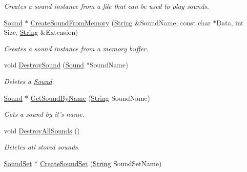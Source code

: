 \begin{DoxyCompactItemize}
\begin{DoxyCompactList}\small\item\em Creates a sound instance from a file that can be used to play sounds. \item\end{DoxyCompactList}\item 
\hyperlink{classphys_1_1Sound}{Sound} $\ast$ \hyperlink{classphys_1_1SoundManager_aa039c3d7a5ee961be0934a58fd3826fa}{CreateSoundFromMemory} (\hyperlink{namespacephys_aa03900411993de7fbfec4789bc1d392e}{String} \&SoundName, const char $\ast$Data, int Size, \hyperlink{namespacephys_aa03900411993de7fbfec4789bc1d392e}{String} \&Extension)
\begin{DoxyCompactList}\small\item\em Creates a sound instance from a memory buffer. \item\end{DoxyCompactList}\item 
void \hyperlink{classphys_1_1SoundManager_a6a996829cab647ccf1ca401361af7167}{DestroySound} (\hyperlink{classphys_1_1Sound}{Sound} $\ast$SoundName)
\begin{DoxyCompactList}\small\item\em Deletes a \hyperlink{classphys_1_1Sound}{Sound}. \item\end{DoxyCompactList}\item 
\hyperlink{classphys_1_1Sound}{Sound} $\ast$ \hyperlink{classphys_1_1SoundManager_aa325440a688757ad74812b7f093e2423}{GetSoundByName} (\hyperlink{namespacephys_aa03900411993de7fbfec4789bc1d392e}{String} SoundName)
\begin{DoxyCompactList}\small\item\em Gets a sound by it's name. \item\end{DoxyCompactList}\item 
void \hyperlink{classphys_1_1SoundManager_a0f523240530abd5ab437c9eace78056a}{DestroyAllSounds} ()
\begin{DoxyCompactList}\small\item\em Deletes all stored sounds. \item\end{DoxyCompactList}\item 
\hyperlink{namespacephys_ab780c3162da5699fe421f3739ba03fc4}{SoundSet} $\ast$ \hyperlink{classphys_1_1SoundManager_afccb11a6f6d9aa9768a185febb0af45a}{CreateSoundSet} (\hyperlink{namespacephys_aa03900411993de7fbfec4789bc1d392e}{String} SoundSetName)

\end{DoxyCompactItemize}
